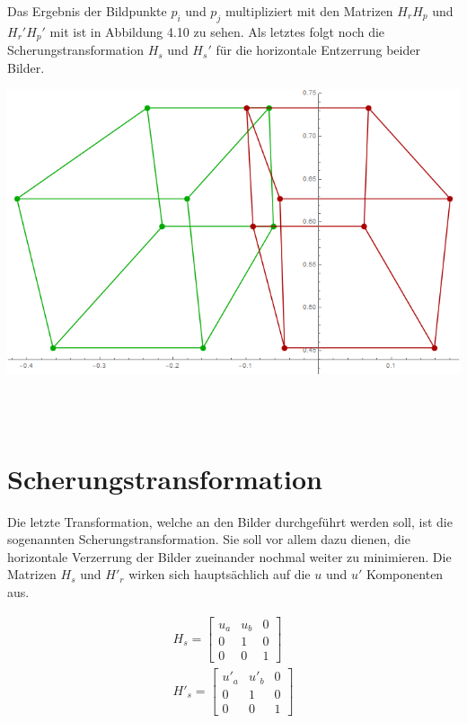 Das Ergebnis der Bildpunkte $p_i$ und $p_j$ multipliziert mit den Matrizen $H_rH_p$ und $H_r'H_p'$ mit ist in Abbildung 4.10 zu sehen. Als letztes folgt noch die Scherungstransformation $H_s$ und $H_s'$ für die horizontale Entzerrung beider Bilder.\\ 

\begin{minipage}{\linewidth}
	\centering
	\includegraphics[width=1.\linewidth]{images/Rectification_HrHp_same_Solutions.png}
\end{minipage}\\ \\

\section{Scherungstransformation}

Die letzte Transformation, welche an den Bilder durchgeführt werden soll, ist die sogenannten Scherungstransformation. Sie soll vor allem dazu dienen, die horizontale Verzerrung der Bilder zueinander nochmal weiter zu minimieren. Die Matrizen $H_s$ und $H'_r$ wirken sich hauptsächlich auf die $u$ und $u'$ Komponenten aus. 

\begin{gather}
	H_s =\begin{bmatrix}
	u_a&u_b&0\\
	0&1&0\\
	0&0&1
	\end{bmatrix}\\
		H'_s =\begin{bmatrix}
	u'_a&u'_b&0\\
	0&1&0\\
	0&0&1
	\end{bmatrix}
\end{gather}

